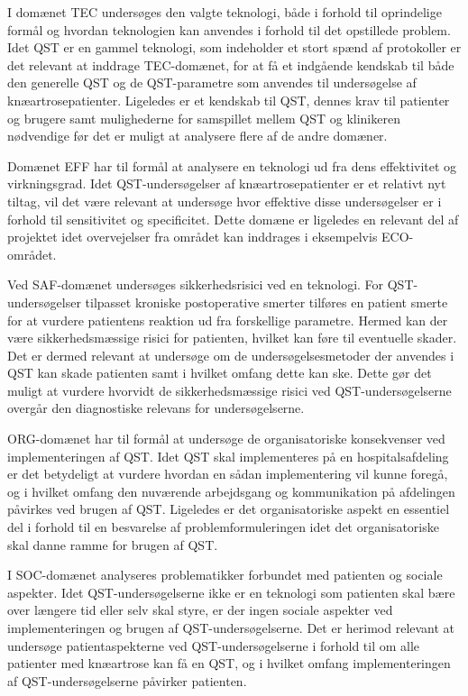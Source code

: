 I domænet TEC undersøges den valgte teknologi, både i forhold til oprindelige formål og hvordan teknologien kan anvendes i forhold til det opstillede problem. Idet QST er en gammel teknologi, som indeholder et stort spænd af protokoller er det relevant at inddrage TEC-domænet, for at få et indgående kendskab til både den generelle QST og de QST-parametre som anvendes til undersøgelse af knæartrosepatienter. Ligeledes er et kendskab til QST, dennes krav til patienter og brugere samt mulighederne for samspillet mellem QST og klinikeren nødvendige før det er muligt at analysere flere af de andre domæner. 

Domænet EFF har til formål at analysere en teknologi ud fra dens effektivitet og virkningsgrad. Idet QST-undersøgelser af knæartrosepatienter er et relativt nyt tiltag, vil det være relevant at undersøge hvor effektive disse undersøgelser er i forhold til sensitivitet og specificitet. Dette domæne er ligeledes en relevant del af projektet idet overvejelser fra området kan inddrages i eksempelvis ECO-området.   

Ved SAF-domænet undersøges sikkerhedsrisici ved en teknologi. For QST-undersøgelser tilpasset kroniske postoperative smerter tilføres en patient smerte for at vurdere patientens reaktion ud fra forskellige parametre. Hermed kan der være sikkerhedsmæssige risici for patienten, hvilket kan føre til eventuelle skader. Det er dermed relevant at undersøge om de undersøgelsesmetoder der anvendes i QST kan skade patienten samt i hvilket omfang dette kan ske. Dette gør det muligt at vurdere hvorvidt de sikkerhedsmæssige risici ved QST-undersøgelserne overgår den diagnostiske relevans for undersøgelserne. 

ORG-domænet har til formål at undersøge de organisatoriske konsekvenser ved implementeringen af QST. Idet QST skal implementeres på en hospitalsafdeling er det betydeligt at vurdere hvordan en sådan implementering vil kunne foregå, og i hvilket omfang den nuværende arbejdsgang og kommunikation på afdelingen påvirkes ved brugen af QST. Ligeledes er det organisatoriske aspekt en essentiel del i forhold til en besvarelse af problemformuleringen idet det organisatoriske skal danne ramme for brugen af QST.

I SOC-domænet analyseres problematikker forbundet med patienten og sociale aspekter. Idet QST-undersøgelserne ikke er en teknologi som patienten skal bære over længere tid eller selv skal styre, er der ingen sociale aspekter ved implementeringen og brugen af QST-undersøgelserne. Det er herimod relevant at undersøge patientaspekterne ved QST-undersøgelserne i forhold til om alle patienter med knæartrose kan få en QST, og i hvilket omfang implementeringen af QST-undersøgelserne påvirker patienten.

